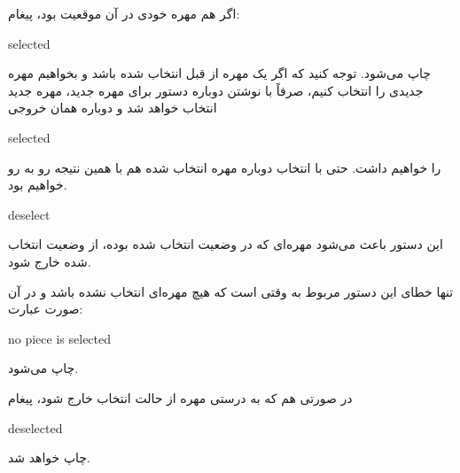 \documentclass[]{article}
\begin{document}
اگر هم مهره خودی در آن موقعیت بود، پیغام:


\begin{tcolorbox}[boxrule=0pt]
	\begin{latin}
  	  \large{
  	  	selected
		}
	\end{latin}
\end{tcolorbox}

چاپ می‌شود. توجه کنید که اگر یک مهره از قبل انتخاب شده باشد و بخواهیم مهره جدیدی را انتخاب کنیم، صرفاً با نوشتن دوباره دستور برای مهره جدید، مهره جدید انتخاب خواهد شد و دوباره همان خروجی


\begin{tcolorbox}[boxrule=0pt]
	\begin{latin}
  	  \large{
  	  	selected
		}
	\end{latin}
\end{tcolorbox}

را خواهیم داشت. حتی با انتخاب دوباره مهره انتخاب شده هم با همین نتیجه رو به رو خواهیم بود.

\hrulefill




\begin{tcolorbox}[boxrule=0pt]
	\begin{latin}
  	  \large{
  	  	deselect
		}
	\end{latin}
\end{tcolorbox}

این دستور باعث می‌شود مهره‌ای که در وضعیت انتخاب شده بوده، از وضعیت انتخاب شده خارج شود.

تنها خطای این دستور مربوط به وقتی است که هیچ مهره‌ای انتخاب نشده باشد و در آن صورت عبارت:


\begin{tcolorbox}[boxrule=0pt]
	\begin{latin}
  	  \large{
  	  	no piece is selected
		}
	\end{latin}
\end{tcolorbox}

چاپ می‌شود.

در صورتی هم که به درستی مهره از حالت انتخاب خارج شود، پیغام



\begin{tcolorbox}[boxrule=0pt]
	\begin{latin}
  	  \large{
  	  	deselected
		}
	\end{latin}
\end{tcolorbox}

چاپ خواهد شد.
\end{document}
